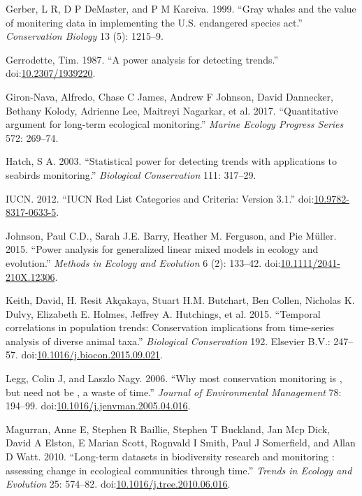 \documentclass[12pt,]{article}
\begin{document}
\hypertarget{refs}{}
\hypertarget{ref-Gerber1999}{}
Gerber, L R, D P DeMaster, and P M Kareiva. 1999. ``Gray whales and the
value of monitering data in implementing the U.S. endangered species
act.'' \emph{Conservation Biology} 13 (5): 1215--9.

\hypertarget{ref-Gerrodette1987}{}
Gerrodette, Tim. 1987. ``A power analysis for detecting trends.''
doi:\href{https://doi.org/10.2307/1939220}{10.2307/1939220}.

\hypertarget{ref-Giron-Nava2017}{}
Giron-Nava, Alfredo, Chase C James, Andrew F Johnson, David Dannecker,
Bethany Kolody, Adrienne Lee, Maitreyi Nagarkar, et al. 2017.
``Quantitative argument for long-term ecological monitoring.''
\emph{Marine Ecology Progress Series} 572: 269--74.

\hypertarget{ref-Hatch2003}{}
Hatch, S A. 2003. ``Statistical power for detecting trends with
applications to seabirds monitoring.'' \emph{Biological Conservation}
111: 317--29.

\hypertarget{ref-IUCN2012}{}
IUCN. 2012. ``IUCN Red List Categories and Criteria: Version 3.1.''
doi:\href{https://doi.org/10.9782-8317-0633-5}{10.9782-8317-0633-5}.

\hypertarget{ref-Johnson2015}{}
Johnson, Paul C.D., Sarah J.E. Barry, Heather M. Ferguson, and Pie
Müller. 2015. ``Power analysis for generalized linear mixed models in
ecology and evolution.'' \emph{Methods in Ecology and Evolution} 6 (2):
133--42.
doi:\href{https://doi.org/10.1111/2041-210X.12306}{10.1111/2041-210X.12306}.

\hypertarget{ref-Keith2015}{}
Keith, David, H. Resit Akçakaya, Stuart H.M. Butchart, Ben Collen,
Nicholas K. Dulvy, Elizabeth E. Holmes, Jeffrey A. Hutchings, et al.
2015. ``Temporal correlations in population trends: Conservation
implications from time-series analysis of diverse animal taxa.''
\emph{Biological Conservation} 192. Elsevier B.V.: 247--57.
doi:\href{https://doi.org/10.1016/j.biocon.2015.09.021}{10.1016/j.biocon.2015.09.021}.

\hypertarget{ref-Legg2006}{}
Legg, Colin J, and Laszlo Nagy. 2006. ``Why most conservation monitoring
is , but need not be , a waste of time.'' \emph{Journal of Environmental
Management} 78: 194--99.
doi:\href{https://doi.org/10.1016/j.jenvman.2005.04.016}{10.1016/j.jenvman.2005.04.016}.

\hypertarget{ref-Magurran2010}{}
Magurran, Anne E, Stephen R Baillie, Stephen T Buckland, Jan Mcp Dick,
David A Elston, E Marian Scott, Rognvald I Smith, Paul J Somerfield, and
Allan D Watt. 2010. ``Long-term datasets in biodiversity research and
monitoring : assessing change in ecological communities through time.''
\emph{Trends in Ecology and Evolution} 25: 574--82.
doi:\href{https://doi.org/10.1016/j.tree.2010.06.016}{10.1016/j.tree.2010.06.016}.
\end{document}
